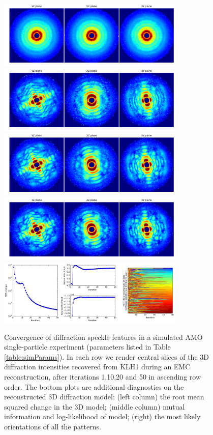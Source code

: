 \documentclass[preprint]{iucr}              %
\begin{document}
\begin{figure}
\caption{Convergence of diffraction speckle features in a simulated AMO single-particle experiment (parameters listed in Table \ref{table:simParams}). In each row we render central slices of the 3D diffraction intensities recovered from KLH1 during an EMC reconstruction, after iterations 1,10,20 and 50 in ascending row order. The bottom plots are additional diagnostics on the reconstructed 3D diffraction model: (left column) the root mean squared change in the 3D model; (middle column) mutual information and log-likelihood of model; (right) the most likely orientations of all the patterns.}
\includegraphics[width=3.5in]{figures/amo_low_intens_001.png} 
\includegraphics[width=3.5in]{figures/amo_low_intens_010.png}
\includegraphics[width=3.5in]{figures/amo_low_intens_020.png} 
\includegraphics[width=3.5in]{figures/amo_low_intens_050.png} \label{fig:amo_low_intens}
\includegraphics[width=3.5in]{figures/amo_low_log.png} \label{fig:amo_low_log}
\end{figure}
\end{document}
